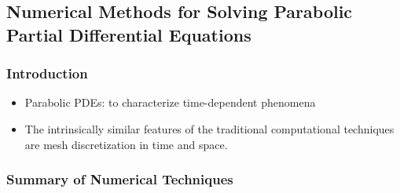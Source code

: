 


\subsection{Numerical Methods for Solving Parabolic Partial Differential Equations}


  \subsubsection{Introduction}

    \begin{itemize}
      \item Parabolic PDEs: to characterize time-dependent phenomena
      \item The intrinsically similar features of the traditional computational techniques are mesh discretization in time and space.
    \end{itemize}

  \subsubsection{Summary of Numerical Techniques}
    
  
